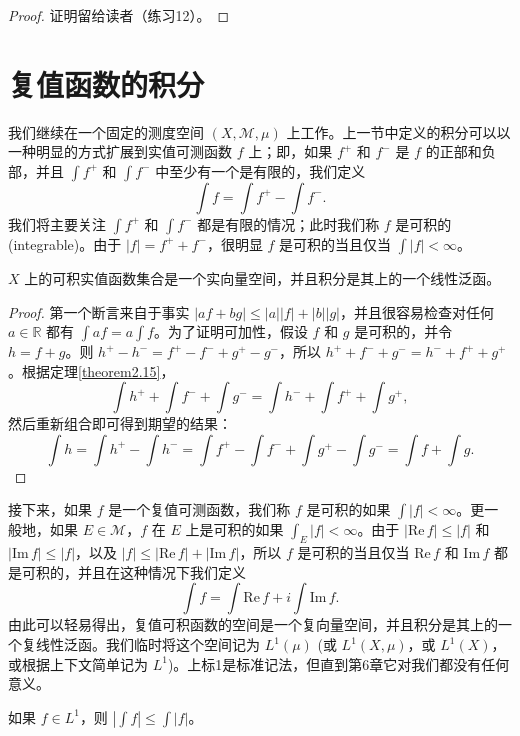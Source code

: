 \documentclass[lang=cn,10pt,thmcnt=section]{elegantbook}
\begin{document}
\begin{proof}
证明留给读者（练习12）。
\end{proof}

\section{复值函数的积分}

我们继续在一个固定的测度空间 $(X, \mathcal{M}, \mu)$ 上工作。上一节中定义的积分可以以一种明显的方式扩展到实值可测函数 $f$ 上；即，如果 $f^+$ 和 $f^-$ 是 $f$ 的正部和负部，并且 $\int f^+$ 和 $\int f^-$ 中至少有一个是有限的，我们定义
\[ \int f = \int f^+ - \int f^-. \]
我们将主要关注 $\int f^+$ 和 $\int f^-$ 都是有限的情况；此时我们称 $f$ 是可积的 (integrable)。由于 $|f| = f^+ + f^-$，很明显 $f$ 是可积的当且仅当 $\int |f| < \infty$。

\begin{proposition}\label{proposition2.21}
$X$ 上的可积实值函数集合是一个实向量空间，并且积分是其上的一个线性泛函。
\end{proposition}

\begin{proof}
第一个断言来自于事实 $|af+bg| \le |a||f| + |b||g|$，并且很容易检查对任何 $a \in \mathbb{R}$ 都有 $\int af = a \int f$。为了证明可加性，假设 $f$ 和 $g$ 是可积的，并令 $h = f+g$。则 $h^+ - h^- = f^+ - f^- + g^+ - g^-$，所以 $h^+ + f^- + g^- = h^- + f^+ + g^+$。根据定理\ref{theorem2.15}，
\[ \int h^+ + \int f^- + \int g^- = \int h^- + \int f^+ + \int g^+, \]
然后重新组合即可得到期望的结果：
\[ \int h = \int h^+ - \int h^- = \int f^+ - \int f^- + \int g^+ - \int g^- = \int f + \int g. \]
\end{proof}

接下来，如果 $f$ 是一个复值可测函数，我们称 $f$ 是可积的如果 $\int |f| < \infty$。更一般地，如果 $E \in \mathcal{M}$，$f$ 在 $E$ 上是可积的如果 $\int_E |f| < \infty$。由于 $|\mathrm{Re}\,f| \le |f|$ 和 $|\mathrm{Im}\,f| \le |f|$，以及 $|f| \le |\mathrm{Re}\,f| + |\mathrm{Im}\,f|$，所以 $f$ 是可积的当且仅当 $\mathrm{Re}\,f$ 和 $\mathrm{Im}\,f$ 都是可积的，并且在这种情况下我们定义
\[ \int f = \int \mathrm{Re}\,f + i \int \mathrm{Im}\,f. \]
由此可以轻易得出，复值可积函数的空间是一个复向量空间，并且积分是其上的一个复线性泛函。我们临时将这个空间记为 $L^1(\mu)$ (或 $L^1(X, \mu)$，或 $L^1(X)$，或根据上下文简单记为 $L^1$)。上标1是标准记法，但直到第6章它对我们都没有任何意义。

\begin{proposition}\label{proposition2.22}
如果 $f \in L^1$，则 $|\int f| \le \int |f|$。
\end{proposition}
\end{document}
